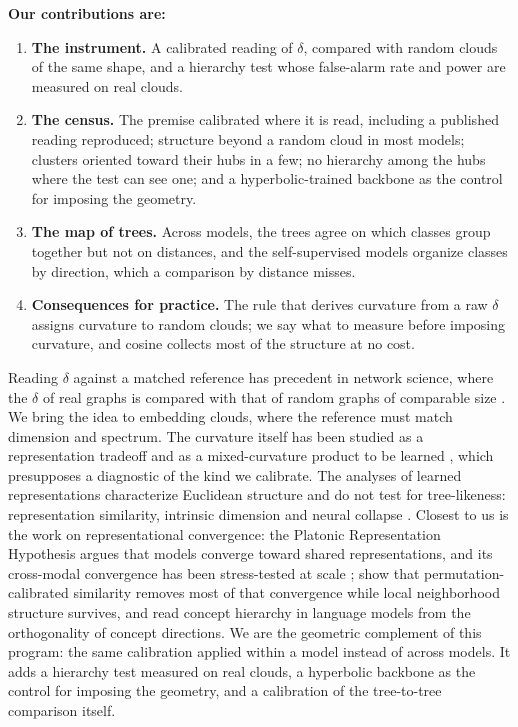 \documentclass{article}
\makeatletter
\theoremstyle{inline}
\theoremstyle{inlineit}
\renewcommand\section{\@startsection{section}{1}{\z@}{-0.3ex plus -0.3ex minus -.2ex}{0.2ex plus 0.2ex minus 0.1ex}{\large\sc\raggedright}}
\makeatother
\begin{document}
\textbf{Our contributions are:}
\begin{enumerate}[topsep=0pt,itemsep=1pt,leftmargin=*]
\item \textbf{The instrument.} A calibrated reading of $\delta$, compared with random clouds of the same shape, and a hierarchy test whose false-alarm rate and power are measured on real clouds.
\item \textbf{The census.} The premise calibrated where it is read, including a published reading reproduced; structure beyond a random cloud in most models; clusters oriented toward their hubs in a few; no hierarchy among the hubs where the test can see one; and a hyperbolic-trained backbone as the control for imposing the geometry.
\item \textbf{The map of trees.} Across models, the trees agree on which classes group together but not on distances, and the self-supervised models organize classes by direction, which a comparison by distance misses.
\item \textbf{Consequences for practice.} The rule that derives curvature from a raw $\delta$ assigns curvature to random clouds; we say what to measure before imposing curvature, and cosine collects most of the structure at no cost.
\end{enumerate}

\section{Related Work}
\label{sec:related}

Reading $\delta$ against a matched reference has precedent in network science, where the $\delta$ of real graphs is compared with that of random graphs of comparable size \citep{narayan2011curvature, kennedy2013hyperbolicity, adcock2013treelike}. We bring the idea to embedding clouds, where the reference must match dimension and spectrum. The curvature itself has been studied as a representation tradeoff \citep{sala2018representation} and as a mixed-curvature product to be learned \citep{gu2019learning}, which presupposes a diagnostic of the kind we calibrate. The analyses of learned representations characterize Euclidean structure and do not test for tree-likeness: representation similarity, intrinsic dimension and neural collapse \citep{kornblith2019cka, ansuini2019intrinsic, pope2021intrinsic, papyan2020prevalence}. Closest to us is the work on representational convergence: the Platonic Representation Hypothesis \citep{huh2024platonic} argues that models converge toward shared representations, and its cross-modal convergence has been stress-tested at scale \citep{koepke2026cave}; \citet{groger2026aristotelian} show that permutation-calibrated similarity removes most of that convergence while local neighborhood structure survives, and \citet{park2024geometry} read concept hierarchy in language models from the orthogonality of concept directions. We are the geometric complement of this program: the same calibration applied within a model instead of across models. It adds a hierarchy test measured on real clouds, a hyperbolic backbone as the control for imposing the geometry, and a calibration of the tree-to-tree comparison itself.
\end{document}
